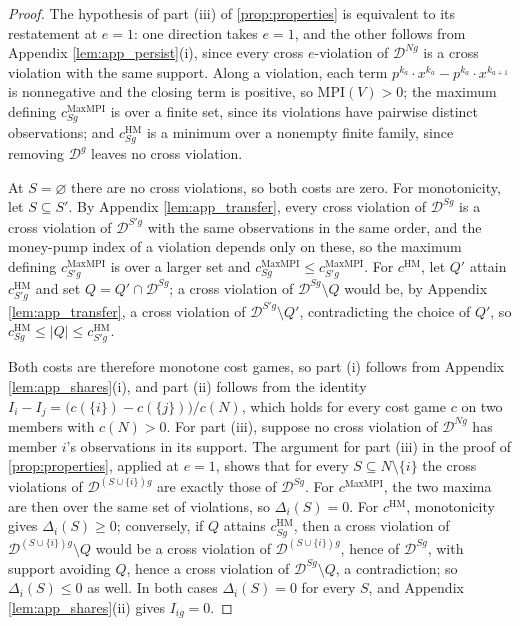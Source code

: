 \documentclass[11 pt]{article}
\begin{document}
\begin{proof}
The hypothesis of part (iii) of \autoref{prop:properties} is equivalent to its restatement at $e = 1$: one direction takes $e = 1$, and the other follows from Appendix \autoref{lem:app_persist}(i), since every cross $e$-violation of $\mathcal{D}^{Ng}$ is a cross violation with the same support. Along a violation, each term $p^{k_a} \cdot x^{k_a} - p^{k_a} \cdot x^{k_{a+1}}$ is nonnegative and the closing term is positive, so $\mathrm{MPI}(V) > 0$; the maximum defining $c^{\mathrm{MaxMPI}}_{Sg}$ is over a finite set, since its violations have pairwise distinct observations; and $c^{\mathrm{HM}}_{Sg}$ is a minimum over a nonempty finite family, since removing $\mathcal{D}^{g}$ leaves no cross violation.

At $S = \varnothing$ there are no cross violations, so both costs are zero. For monotonicity, let $S \subseteq S'$. By Appendix \autoref{lem:app_transfer}, every cross violation of $\mathcal{D}^{Sg}$ is a cross violation of $\mathcal{D}^{S'g}$ with the same observations in the same order, and the money-pump index of a violation depends only on these, so the maximum defining $c^{\mathrm{MaxMPI}}_{S'g}$ is over a larger set and $c^{\mathrm{MaxMPI}}_{Sg} \leq c^{\mathrm{MaxMPI}}_{S'g}$. For $c^{\mathrm{HM}}$, let $Q'$ attain $c^{\mathrm{HM}}_{S'g}$ and set $Q = Q' \cap \mathcal{D}^{Sg}$; a cross violation of $\mathcal{D}^{Sg} \setminus Q$ would be, by Appendix \autoref{lem:app_transfer}, a cross violation of $\mathcal{D}^{S'g} \setminus Q'$, contradicting the choice of $Q'$, so $c^{\mathrm{HM}}_{Sg} \leq |Q| \leq c^{\mathrm{HM}}_{S'g}$.

Both costs are therefore monotone cost games, so part (i) follows from Appendix \autoref{lem:app_shares}(i), and part (ii) follows from the identity $I_{i} - I_{j} = \bigl( c(\{i\}) - c(\{j\}) \bigr)/c(N)$, which holds for every cost game $c$ on two members with $c(N) > 0$. For part (iii), suppose no cross violation of $\mathcal{D}^{Ng}$ has member $i$'s observations in its support. The argument for part (iii) in the proof of \autoref{prop:properties}, applied at $e = 1$, shows that for every $S \subseteq N \setminus \{i\}$ the cross violations of $\mathcal{D}^{(S \cup \{i\})g}$ are exactly those of $\mathcal{D}^{Sg}$. For $c^{\mathrm{MaxMPI}}$, the two maxima are then over the same set of violations, so $\Delta_{i}(S) = 0$. For $c^{\mathrm{HM}}$, monotonicity gives $\Delta_{i}(S) \geq 0$; conversely, if $Q$ attains $c^{\mathrm{HM}}_{Sg}$, then a cross violation of $\mathcal{D}^{(S \cup \{i\})g} \setminus Q$ would be a cross violation of $\mathcal{D}^{(S \cup \{i\})g}$, hence of $\mathcal{D}^{Sg}$, with support avoiding $Q$, hence a cross violation of $\mathcal{D}^{Sg} \setminus Q$, a contradiction; so $\Delta_{i}(S) \leq 0$ as well. In both cases $\Delta_{i}(S) = 0$ for every $S$, and Appendix \autoref{lem:app_shares}(ii) gives $I_{ig} = 0$.
\end{proof}
\end{document}
